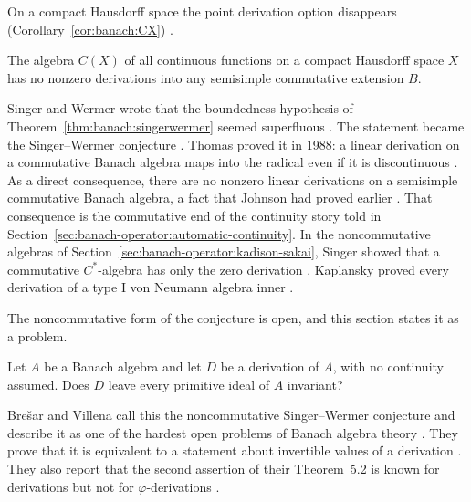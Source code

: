 On a compact Hausdorff space the point derivation option disappears (Corollary~\ref{cor:banach:CX})
\cite[p.~264]{SingerWermer1955}.\begin{corollary}\label{cor:banach:CX}
The algebra $C(X)$ of all continuous functions on a compact Hausdorff space
$X$ has no nonzero derivations into any semisimple commutative extension
$B$.
\end{corollary}

Singer and Wermer wrote that the boundedness hypothesis of
Theorem~\ref{thm:banach:singerwermer} seemed superfluous
\cite[p.~260]{SingerWermer1955}. The statement became the Singer--Wermer
conjecture \cite[p.~523]{MiuraHirasawaTakahasi2006}. Thomas proved it in 1988:
a linear derivation on a commutative Banach algebra maps into the radical even
if it is discontinuous \cite[pp.~435--460]{Thomas1988Image}. As a direct
consequence, there are no nonzero linear derivations on a semisimple
commutative Banach algebra, a fact that Johnson had proved earlier
\cite[p.~523]{MiuraHirasawaTakahasi2006}. That consequence is the commutative
end of the continuity story told in
Section~\ref{sec:banach-operator:automatic-continuity}. In the noncommutative
algebras of Section~\ref{sec:banach-operator:kadison-sakai}, Singer showed
that a commutative $C^*$-algebra has only the zero derivation
\cite[pp.~260--261]{SingerWermer1955}. Kaplansky proved every derivation of a
type I von Neumann algebra inner \cite[p.~280]{Kadison1966}.

The noncommutative form of the conjecture is open, and this section states it
as a problem.

\begin{problem}\label{prob:open:sw}
Let $A$ be a Banach algebra and let $D$ be a derivation of $A$, with no
continuity assumed.
Does $D$ leave every primitive ideal of $A$ invariant?
\end{problem}

Bre\v{s}ar and Villena call this the noncommutative Singer--Wermer conjecture
and describe it as one of the hardest open problems of Banach algebra theory
\cite[p.~710]{BresarVillena2002}. They prove that it is equivalent to a
statement about invertible values of a derivation \cite[Theorem~5.2,
p.~719]{BresarVillena2002}. They also report that the second assertion of
their Theorem~5.2 is known for derivations but not for $\varphi$-derivations
\cite[Remark~5.3, p.~720]{BresarVillena2002}.

